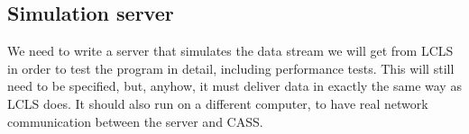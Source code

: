 \documentclass[11pt,a4paper,oneside]{article}
\begin{document}
\subsection{Simulation server}
\label{sec:simulation-server}

We need to write a server that simulates the data stream we will get from LCLS in order to test the
program in detail, including performance tests. This will still need to be specified, but, anyhow,
it must deliver data in exactly the same way as LCLS does. It should also run on a different
computer, to have real network communication between the server and CASS.


\begin{flushright}
\end{flushright}
\end{document}

